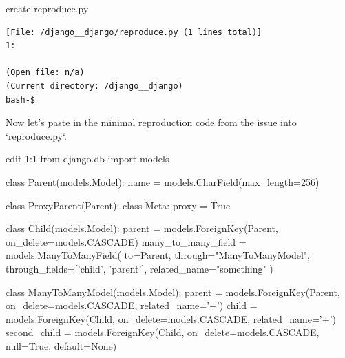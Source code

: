 {\begin{agentbox}
\hrulefill
\begin{CodeVerbatim}[breaklines=true, breakanywhere=true]
create reproduce.py
\end{CodeVerbatim}
\end{agentbox}
\begin{observationbox}\begin{Verbatim}[breaklines=true, breakanywhere=true]
[File: /django__django/reproduce.py (1 lines total)]
1:

(Open file: n/a)
(Current directory: /django__django)
bash-$
\end{Verbatim}
\end{observationbox}
\begin{agentbox}
Now let's paste in the minimal reproduction code from the issue into `reproduce.py`.



\hrulefill
\begin{CodeVerbatim}[breaklines=true, breakanywhere=true]
edit 1:1
from django.db import models

class Parent(models.Model):
    name = models.CharField(max_length=256)

class ProxyParent(Parent):
    class Meta:
        proxy = True

class Child(models.Model):
    parent = models.ForeignKey(Parent, on_delete=models.CASCADE)
    many_to_many_field = models.ManyToManyField(
        to=Parent,
        through="ManyToManyModel",
        through_fields=['child', 'parent'],
        related_name="something"
    )

class ManyToManyModel(models.Model):
    parent = models.ForeignKey(Parent, on_delete=models.CASCADE, related_name='+')
    child = models.ForeignKey(Child, on_delete=models.CASCADE, related_name='+')
    second_child = models.ForeignKey(Child, on_delete=models.CASCADE, null=True, default=None)


\end{CodeVerbatim}
\end{agentbox}}
